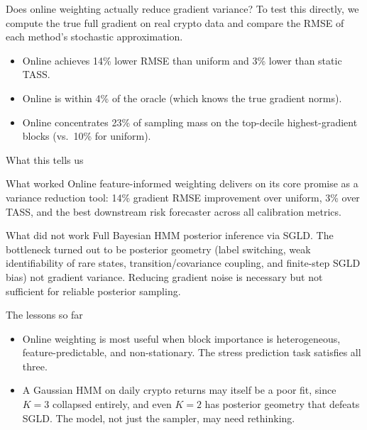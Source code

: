 \documentclass[aspectratio=169]{beamer}
\begin{document}
\begin{frame}{Does online weighting actually reduce gradient variance?}
  To test this directly, we compute the true full gradient on real crypto data and compare the RMSE of each method's stochastic approximation.

  \vspace{0.5em}
  \centering
  \resizebox{0.7\linewidth}{!}{}

  \vspace{0.5em}
  \begin{itemize}
    \item Online achieves 14\% lower RMSE than uniform and 3\% lower than static TASS.
    \item Online is within 4\% of the oracle (which knows the true gradient norms).
    \item Online concentrates 23\% of sampling mass on the top-decile highest-gradient blocks (vs.\ 10\% for uniform).
  \end{itemize}
\end{frame}

\begin{frame}{What this tells us}
  \begin{block}{What worked}
    Online feature-informed weighting delivers on its core promise as a variance reduction tool: 14\% gradient RMSE improvement over uniform, 3\% over TASS, and the best downstream risk forecaster across all calibration metrics.
  \end{block}

  \begin{block}{What did not work}
    Full Bayesian HMM posterior inference via SGLD. The bottleneck turned out to be posterior geometry (label switching, weak identifiability of rare states, transition/covariance coupling, and finite-step SGLD bias) not gradient variance. Reducing gradient noise is necessary but not sufficient for reliable posterior sampling.
  \end{block}
\end{frame}

\begin{frame}{The lessons so far}
    \begin{itemize}
      \item Online weighting is most useful when block importance is heterogeneous, feature-predictable, and non-stationary. The stress prediction task satisfies all three.
      \item A Gaussian HMM on daily crypto returns may itself be a poor fit, since $K=3$ collapsed entirely, and even $K=2$ has posterior geometry that defeats SGLD. The model, not just the sampler, may need rethinking.
    \end{itemize}
\end{frame}
\end{document}
